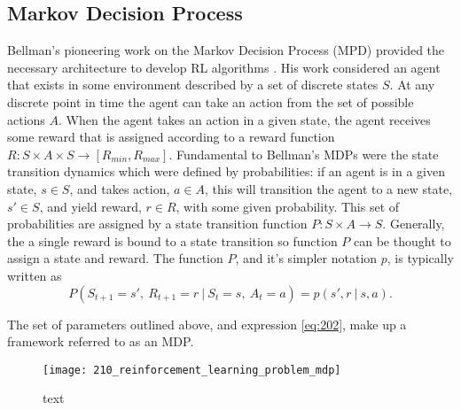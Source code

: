 \subsection{Markov Decision Process}
Bellman's pioneering work on the Markov Decision Process (MPD) provided the necessary architecture to develop RL algorithms \cite{Bellm1957}. His work considered an agent that exists in some environment described by a set of discrete states $S$. At any discrete point in time the agent can take an action from the set of possible actions $A$. When the agent takes an action in a given state, the agent receives some reward that is assigned according to a reward function $R: S \times A \times S \to [R_{min}, R_{max}]$. Fundamental to Bellman's MDPs were the state transition dynamics which were defined by probabilities: if an agent is in a given state, $s \in S$, and takes action, $a \in A$, this will transition the agent to a new state, $s' \in S$, and yield reward, $r \in R$, with some given probability. This set of probabilities are assigned by a state transition function $P: S \times A \to S$. Generally, the a single reward is bound to a state transition so function $P$ can be thought to assign a state and reward. The function $P$, and it's simpler notation $p$, is typically written as
\begin{equation}
	P(S_{t+1} = s', \ R_{t+1} = r \ | \ S_t = s, \ A_t = a) = p(s', r \ | \ s, a). \label{eq:202}
\end{equation}

The set of parameters outlined above, and expression \ref{eq:202}, make up a framework referred to as an MDP.

\begin{figure}[h]
\centering
\texttt{[image: 210\_reinforcement\_learning\_problem\_mdp]}
\caption{text}
\label{fig:210_reinforcement_learning_problem_mdp}
\end{figure}


